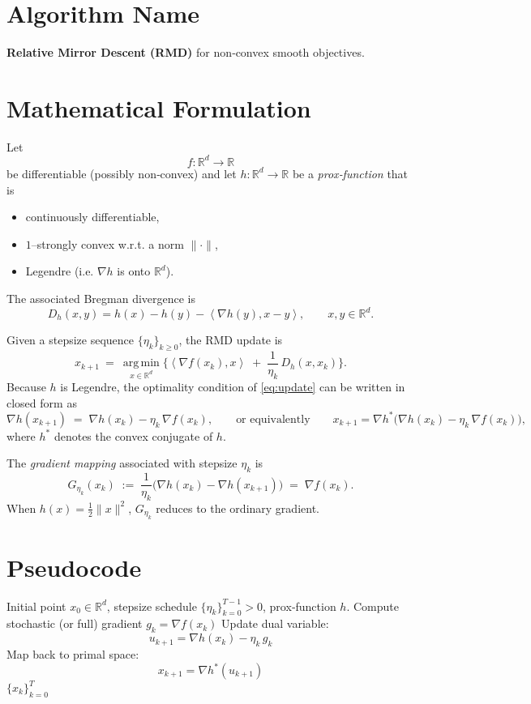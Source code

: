 \documentclass{article}
\newcommand{\grad}{\nabla}
\newcommand{\Dh}{D_h}
\newcommand{\argmin}{\operatorname*{arg\,min}}
\newcommand{\R}{\mathbb{R}}
\newcommand{\inner}[2]{\left\langle #1,#2\right\rangle}
\begin{document}
\section*{Algorithm Name}
\textbf{Relative Mirror Descent (RMD)} for non‑convex smooth objectives.

\section*{Mathematical Formulation}
Let 
\[
f:\R^{d}\rightarrow\R
\]
be differentiable (possibly non‑convex) and let $h:\R^{d}\rightarrow\R$ be a \emph{prox‑function} that is
\begin{itemize}
\item continuously differentiable,
\item $1$–strongly convex w.r.t. a norm $\|\cdot\|$,
\item Legendre (i.e. $\nabla h$ is onto $\R^{d}$).
\end{itemize}
The associated Bregman divergence is
\[
\Dh(x,y)=h(x)-h(y)-\inner{\nabla h(y)}{x-y},\qquad x,y\in\R^{d}.
\]

Given a stepsize sequence $\{\eta_k\}_{k\ge 0}$, the RMD update is
\begin{equation}
\label{eq:update}
x_{k+1}
~=~\argmin_{x\in\R^{d}}\Big\{
\inner{\grad f(x_k)}{x}\;+\;\frac{1}{\eta_k}\,\Dh(x,x_k)
\Big\}.
\end{equation}
Because $h$ is Legendre, the optimality condition of \eqref{eq:update} can be written in closed form as
\begin{equation}
\label{eq:closed}
\nabla h(x_{k+1}) \;=\; \nabla h(x_k)-\eta_k\,\grad f(x_k),
\qquad\text{or equivalently}\qquad
x_{k+1}= \nabla h^{*}\!\big(\nabla h(x_k)-\eta_k\,\grad f(x_k)\big),
\end{equation}
where $h^{*}$ denotes the convex conjugate of $h$.

The \emph{gradient mapping} associated with stepsize $\eta_k$ is
\[
G_{\eta_k}(x_k)\;:=\;\frac{1}{\eta_k}\big(\nabla h(x_k)-\nabla h(x_{k+1})\big)
\;=\;\grad f(x_k).
\]
When $h(x)=\tfrac12\|x\|^{2}$, $G_{\eta_k}$ reduces to the ordinary gradient.

\section*{Pseudocode}
\begin{algorithm}[H]
\caption{Relative Mirror Descent (RMD)}
\begin{algorithmic}[1]
\REQUIRE Initial point $x_{0}\in\R^{d}$, stepsize schedule $\{\eta_k\}_{k=0}^{T-1}>0$, prox‑function $h$.
    \STATE Compute stochastic (or full) gradient $g_k=\grad f(x_k)$
    \STATE Update dual variable:
    \[
    u_{k+1}= \nabla h(x_k)-\eta_k\,g_k
    \]
    \STATE Map back to primal space:
    \[
    x_{k+1}= \nabla h^{*}(u_{k+1})
    \]
\ENDFOR
\RETURN $\{x_k\}_{k=0}^{T}$
\end{algorithmic}
\end{algorithm}
\end{document}
